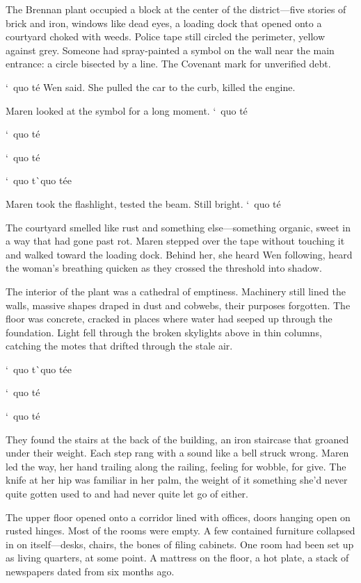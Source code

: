 \documentclass[12pt,letterpaper,openany]{book}
\begin{document}
\par
The Brennan plant occupied a block at the center of the district—five stories of brick and iron, windows like dead eyes, a loading dock that opened onto a courtyard choked with weeds. Police tape still circled the perimeter, yellow against grey. Someone had spray-painted a symbol on the wall near the main entrance: a circle bisected by a line. The Covenant mark for unverified debt.
\par
`\ quo t\'e{} Wen said. She pulled the car to the curb, killed the engine.
\par
Maren looked at the symbol for a long moment. `\ quo t\'e{}
\par
`\ quo t\'e{}
\par
`\ quo t\'e{}
\par
`\ quo t\`\ quo t\'e{}e{}
\par
Maren took the flashlight, tested the beam. Still bright. `\ quo t\'e{}
\par
The courtyard smelled like rust and something else—something organic, sweet in a way that had gone past rot. Maren stepped over the tape without touching it and walked toward the loading dock. Behind her, she heard Wen following, heard the woman's breathing quicken as they crossed the threshold into shadow.
\par
The interior of the plant was a cathedral of emptiness. Machinery still lined the walls, massive shapes draped in dust and cobwebs, their purposes forgotten. The floor was concrete, cracked in places where water had seeped up through the foundation. Light fell through the broken skylights above in thin columns, catching the motes that drifted through the stale air.
\par
`\ quo t\`\ quo t\'e{}e{}
\par
`\ quo t\'e{}
\par
`\ quo t\'e{}
\par
They found the stairs at the back of the building, an iron staircase that groaned under their weight. Each step rang with a sound like a bell struck wrong. Maren led the way, her hand trailing along the railing, feeling for wobble, for give. The knife at her hip was familiar in her palm, the weight of it something she'd never quite gotten used to and had never quite let go of either.
\par
The upper floor opened onto a corridor lined with offices, doors hanging open on rusted hinges. Most of the rooms were empty. A few contained furniture collapsed in on itself—desks, chairs, the bones of filing cabinets. One room had been set up as living quarters, at some point. A mattress on the floor, a hot plate, a stack of newspapers dated from six months ago.
\end{document}
